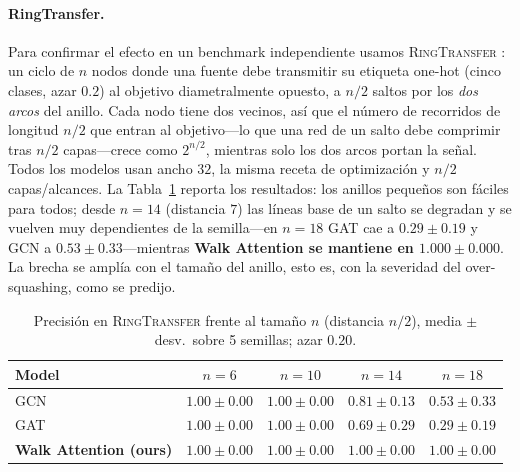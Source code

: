 \documentclass[runningheads]{llncs}
\begin{document}
\paragraph{RingTransfer.}
Para confirmar el efecto en un benchmark independiente usamos
\textsc{RingTransfer}
\cite{digiovanni2023oversquashing}: un ciclo de $n$ nodos donde una fuente debe
transmitir su etiqueta one-hot (cinco clases, azar $0.2$) al objetivo
diametralmente opuesto, a $n/2$ saltos por los \emph{dos arcos} del anillo.
Cada nodo tiene dos vecinos, así que el número de recorridos de longitud $n/2$
que entran al objetivo---lo que una red de un salto debe comprimir tras $n/2$
capas---crece como $2^{n/2}$, mientras solo los dos arcos portan la señal.
Todos los modelos usan ancho $32$, la misma receta de optimización y $n/2$
capas/alcances. La Tabla~\ref{tab:ring} reporta los resultados: los anillos
pequeños son fáciles para todos; desde $n{=}14$ (distancia $7$) las líneas base
de un salto se degradan y se vuelven muy dependientes de la semilla---en
$n{=}18$ GAT cae a $0.29\pm0.19$ y GCN a $0.53\pm0.33$---mientras
\textbf{Walk Attention se mantiene en $1.000\pm0.000$}. La brecha se amplía con
el tamaño del anillo, esto es, con la severidad del over-squashing, como se
predijo.

\begin{table}[t]
\centering
\caption{Precisión en \textsc{RingTransfer} frente al tamaño $n$ (distancia
$n/2$), media $\pm$ desv.\ sobre 5 semillas; azar $0.20$.}
\label{tab:ring}
\begin{tabular}{lcccc}
\toprule
\textbf{Model} & $n{=}6$ & $n{=}10$ & $n{=}14$ & $n{=}18$ \\
\midrule
GCN                    & $1.00\pm0.00$ & $1.00\pm0.00$ & $0.81\pm0.13$ & $0.53\pm0.33$ \\
GAT                    & $1.00\pm0.00$ & $1.00\pm0.00$ & $0.69\pm0.29$ & $0.29\pm0.19$ \\
\textbf{Walk Attention (ours)} & $\mathbf{1.00\pm0.00}$ & $\mathbf{1.00\pm0.00}$ & $\mathbf{1.00\pm0.00}$ & $\mathbf{1.00\pm0.00}$ \\
\bottomrule
\end{tabular}
\end{table}
\end{document}
